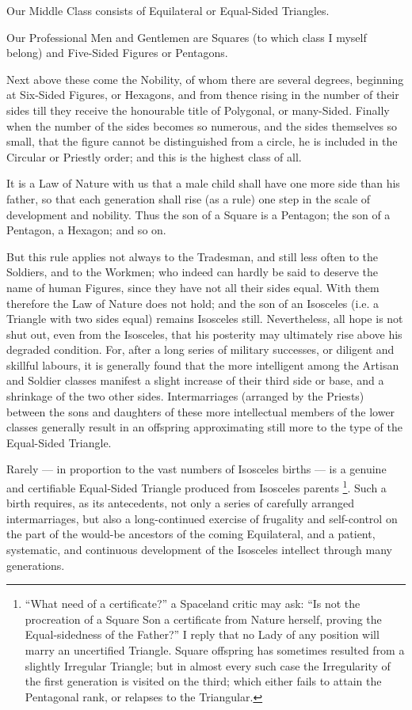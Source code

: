\documentclass[12pt, a4paper, oneside]{memoir}
\begin{document}
Our Middle Class consists of Equilateral or Equal-Sided Triangles.

Our Professional Men and Gentlemen are Squares (to which class I myself
belong) and Five-Sided Figures or Pentagons.

Next above these come the Nobility, of whom there are several degrees,
beginning at Six-Sided Figures, or Hexagons, and from thence rising in the
number of their sides till they receive the honourable title of Polygonal, or
many-Sided. Finally when the number of the sides becomes so numerous, and the
sides themselves so small, that the figure cannot be distinguished from a
circle, he is included in the Circular or Priestly order; and this is the
highest class of all.

It is a Law of Nature with us that a male child shall have one more side than
his father, so that each generation shall rise (as a rule) one step in the
scale of development and nobility. Thus the son of a Square is a Pentagon; the
son of a Pentagon, a Hexagon; and so on.

But this rule applies not always to the Tradesman, and still less often to the
Soldiers, and to the Workmen; who indeed can hardly be said to deserve the
name of human Figures, since they have not all their sides equal. With them
therefore the Law of Nature does not hold; and the son of an Isosceles (i.e. a
Triangle with two sides equal) remains Isosceles still. Nevertheless, all hope
is not shut out, even from the Isosceles, that his posterity may ultimately
rise above his degraded condition. For, after a long series of military
successes, or diligent and skillful labours, it is generally found that the
more intelligent among the Artisan and Soldier classes manifest a slight
increase of their third side or base, and a shrinkage of the two other sides.
Intermarriages (arranged by the Priests) between the sons and daughters of
these more intellectual members of the lower classes generally result in an
offspring approximating still more to the type of the Equal-Sided Triangle.

Rarely --- in proportion to the vast numbers of Isosceles births --- is a genuine
and certifiable Equal-Sided Triangle produced from Isosceles parents
\footnote{ ``What need of a certificate?'' a Spaceland critic may ask: ``Is not
the procreation of a Square Son a certificate from Nature herself, proving the
Equal-sidedness of the Father?'' I reply that no Lady of any position will
marry an uncertified Triangle. Square offspring has sometimes resulted from a
slightly Irregular Triangle; but in almost every such case the Irregularity of
the first generation is visited on the third; which either fails to attain the
Pentagonal rank, or relapses to the Triangular.}. Such a birth requires, as
its antecedents, not only a series of carefully arranged intermarriages, but
also a long-continued exercise of frugality and self-control on the part of
the would-be ancestors of the coming Equilateral, and a patient, systematic,
and continuous development of the Isosceles intellect through many
generations.
\end{document}
